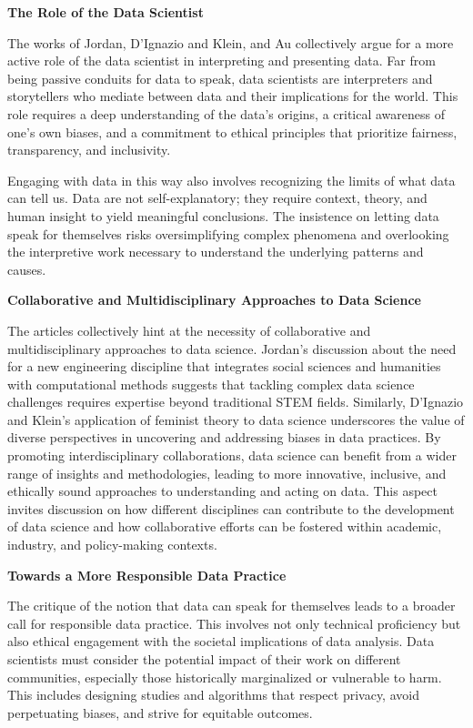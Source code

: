 \documentclass[
  letterpaper,
  DIV=11,
  numbers=noendperiod]{scrartcl}
\begin{document}
\textbf{The Role of the Data Scientist}

The works of Jordan, D'Ignazio and Klein, and Au collectively argue for
a more active role of the data scientist in interpreting and presenting
data. Far from being passive conduits for data to speak, data scientists
are interpreters and storytellers who mediate between data and their
implications for the world. This role requires a deep understanding of
the data's origins, a critical awareness of one's own biases, and a
commitment to ethical principles that prioritize fairness, transparency,
and inclusivity.

Engaging with data in this way also involves recognizing the limits of
what data can tell us. Data are not self-explanatory; they require
context, theory, and human insight to yield meaningful conclusions. The
insistence on letting data speak for themselves risks oversimplifying
complex phenomena and overlooking the interpretive work necessary to
understand the underlying patterns and causes.

\textbf{Collaborative and Multidisciplinary Approaches to Data Science}

The articles collectively hint at the necessity of collaborative and
multidisciplinary approaches to data science. Jordan's discussion about
the need for a new engineering discipline that integrates social
sciences and humanities with computational methods suggests that
tackling complex data science challenges requires expertise beyond
traditional STEM fields. Similarly, D'Ignazio and Klein's application of
feminist theory to data science underscores the value of diverse
perspectives in uncovering and addressing biases in data practices. By
promoting interdisciplinary collaborations, data science can benefit
from a wider range of insights and methodologies, leading to more
innovative, inclusive, and ethically sound approaches to understanding
and acting on data. This aspect invites discussion on how different
disciplines can contribute to the development of data science and how
collaborative efforts can be fostered within academic, industry, and
policy-making contexts.

\textbf{Towards a More Responsible Data Practice}

The critique of the notion that data can speak for themselves leads to a
broader call for responsible data practice. This involves not only
technical proficiency but also ethical engagement with the societal
implications of data analysis. Data scientists must consider the
potential impact of their work on different communities, especially
those historically marginalized or vulnerable to harm. This includes
designing studies and algorithms that respect privacy, avoid
perpetuating biases, and strive for equitable outcomes.
\end{document}
